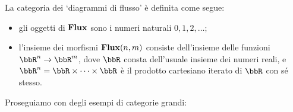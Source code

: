 \begin{example}\label{ex_cat_flusso}
	La categoria dei `diagrammi di flusso' è definita come segue:
	\begin{itemize}
		\item gli oggetti di $\mathbf{Flux}$ sono i numeri naturali $0,1,2,\dots$;
		\item l'insieme dei morfismi $\mathbf{Flux}(n,m)$ consiste dell'insieme delle funzioni $\bbR^n\to \bbR^m$, dove $\bbR$ consta dell'usuale insieme dei numeri reali, e $\bbR^n = \bbR\times\dots\times\bbR$ è il prodotto cartesiano iterato di $\bbR$ con sé stesso.
	\end{itemize}
\end{example}
Proseguiamo con degli esempi di categorie grandi:
\begin{example}\label{ex_cat_insiemi_fin}
\end{example}
\begin{example}\label{ex_cat_matrici}
\end{example}
\begin{example}\label{ex_cat_insiemi}
\end{example}
\begin{example}\label{ex_cat_ordinali}
\end{example}
\begin{example}\label{ex_cat_relazioni}
\end{example}
\begin{example}\label{ex_cat_algebre}
\end{example}
\begin{example}\label{ex_cat_sigma_strutture}
\end{example}
\begin{example}\label{ex_cat_top}
\end{example}
\begin{example}\label{ex_cat_ordini}
\end{example}

